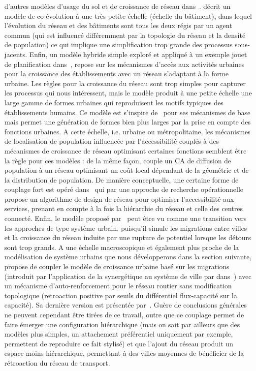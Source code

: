 {d'autres modèles d'usage du sol et de croissance de réseau dans~\cite{rui2013urban}. \cite{achibet2014model} décrit un modèle de co-évolution à une très petite échelle (échelle du bâtiment), dans lequel l'évolution du réseau et des bâtiments sont tous les deux régis par un agent commun (qui est influencé différemment par la topologie du réseau et la densité de population) ce qui implique une simplification trop grande des processus sous-jacents. Enfin, un modèle hybride simple exploré et appliqué à un exemple jouet de planification dans~\cite{raimbault2014hybrid}, repose sur les mécanismes d'accès aux activités urbaines pour la croissance des établissements avec un réseau s'adaptant à la forme urbaine. Les règles pour la croissance du réseau sont trop simples pour capturer les processus qui nous intéressent, mais le modèle produit à une petite échelle une large gamme de formes urbaines qui reproduisent les motifs typiques des établissements humains. Ce modèle est s'inspire de~\cite{moreno2012automate} pour ses mécanismes de base mais permet une génération de formes bien plus larges par la prise en compte des fonctions urbaines. A cette échelle, i.e. urbaine ou métropolitaine, les mécanismes de localisation de population influencée par l'accessibilité couplés à des mécanismes de croissance de réseau optimisant certaines fonctions semblent être la règle pour ces modèles : de la même façon, \cite{wu2017city} couple un CA de diffusion de population à un réseau optimisant un coût local dépendant de la géométrie et de la distribution de population. De manière conceptuelle, une certaine forme de couplage fort est opéré dans~\cite{bigotte2010integrated} qui par une approche de recherche opérationnelle propose un algorithme de design de réseau pour optimiser l'accessibilité aux services, prenant en compte à la fois la hiérarchie du réseau et celle des centres connecté. Enfin, le modèle proposé par~\cite{blumenfeld2010network} peut être vu comme une transition vers les approches de type système urbain, puisqu'il simule les migrations entre villes et la croissance du réseau induite par une rupture de potentiel lorsque les détours sont trop grands. A une échelle macroscopique et également plus proche de la modélisation de système urbains que nous développerons dans la section suivante, \cite{baptiste1999interactions} propose de coupler le modèle de croissance urbaine basé sur les migrations (introduit par l'application de la synergétique au système de ville par  dans~\cite{sanders1992systeme}) avec un mécanisme d'auto-renforcement pour le réseau routier sans modification topologique (retroaction positive par seuils du différentiel flux-capacité sur la capacité). Sa dernière version est présentée par~\cite{baptistemodeling}. Guère de conclusions générales ne peuvent cependant être tirées de ce travail, outre que ce couplage permet de faire émerger une configuration hiérarchique (mais on sait par ailleurs que des modèles plus simples, un attachement préférentiel uniquement par exemple, permettent de reproduire ce fait stylisé) et que l'ajout du réseau produit un espace moins hiérarchique, permettant à des villes moyennes de bénéficier de la rétroaction du réseau de transport.
}



